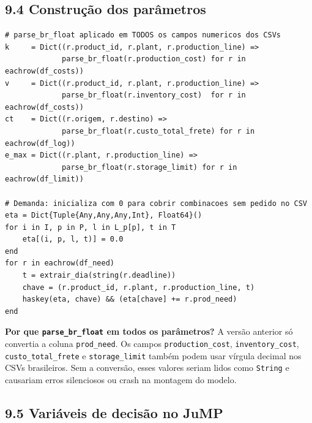 \documentclass[12pt, a4paper]{article}
\begin{document}
\subsection*{9.4 Constru\c{c}\~{a}o dos par\^{a}metros}

\begin{mdframed}[style=codigo]
\begin{lstlisting}
# parse_br_float aplicado em TODOS os campos numericos dos CSVs
k     = Dict((r.product_id, r.plant, r.production_line) =>
             parse_br_float(r.production_cost) for r in eachrow(df_costs))
v     = Dict((r.product_id, r.plant, r.production_line) =>
             parse_br_float(r.inventory_cost)  for r in eachrow(df_costs))
ct    = Dict((r.origem, r.destino) =>
             parse_br_float(r.custo_total_frete) for r in eachrow(df_log))
e_max = Dict((r.plant, r.production_line) =>
             parse_br_float(r.storage_limit) for r in eachrow(df_limit))

# Demanda: inicializa com 0 para cobrir combinacoes sem pedido no CSV
eta = Dict{Tuple{Any,Any,Any,Int}, Float64}()
for i in I, p in P, l in L_p[p], t in T
    eta[(i, p, l, t)] = 0.0
end
for r in eachrow(df_need)
    t = extrair_dia(string(r.deadline))
    chave = (r.product_id, r.plant, r.production_line, t)
    haskey(eta, chave) && (eta[chave] += r.prod_need)
end
\end{lstlisting}
\end{mdframed}

\begin{mdframed}[style=destaque]
\textbf{\color{ballblue}Por que \texttt{parse\_br\_float} em todos os par\^{a}metros?}
A vers\~{a}o anterior s\'{o} convertia a coluna \texttt{prod\_need}.
Os campos \texttt{production\_cost}, \texttt{inventory\_cost}, \texttt{custo\_total\_frete}
e \texttt{storage\_limit} tamb\'{e}m podem usar v\'{i}rgula decimal nos CSVs brasileiros.
Sem a convers\~{a}o, esses valores seriam lidos como \texttt{String} e causariam erros
silenciosos ou crash na montagem do modelo.
\end{mdframed}

\subsection*{9.5 Vari\'{a}veis de decis\~{a}o no JuMP}
\end{document}
